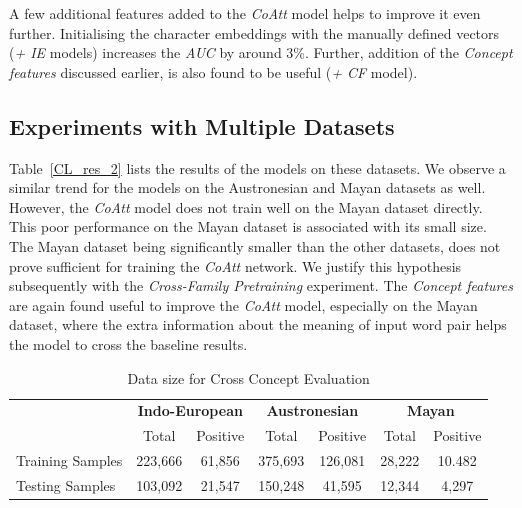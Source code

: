 \documentclass[11pt,letterpaper]{article}
\begin{document}
A few additional features added to the \textit{CoAtt} model helps to improve it even further. Initialising the character embeddings with the manually defined vectors (\textit{+ IE} models) increases the \textit{AUC} by around 3\%. Further, addition of the \textit{Concept features} discussed earlier, is also found to be useful (\textit{+ CF} model).

\subsection{Experiments with Multiple Datasets}

Table~\ref{CL_res_2} lists the results of the models on these datasets. We observe a similar trend for the models on the Austronesian and Mayan datasets as well. However, the \textit{CoAtt} model does not train well on the Mayan dataset directly. This poor performance on the Mayan dataset is associated with its small size. The Mayan dataset being significantly smaller than the other datasets, does not prove sufficient for training the \textit{CoAtt} network. We justify this hypothesis subsequently with the \textit{Cross-Family Pretraining} experiment. The \textit{Concept features} are again found useful to improve the \textit{CoAtt} model, especially on the Mayan dataset, where the extra information about the meaning of input word pair helps the model to cross the baseline results. 

\begin{table}[t]
\centering
\begin{tabular}{lcccccc}
\multicolumn{1}{c}{\textbf{}} & \multicolumn{2}{c}{\textbf{Indo-European}} & \multicolumn{2}{c}{\textbf{Austronesian}} & \multicolumn{2}{c}{\textbf{Mayan}} \\
\multicolumn{1}{c}{}          & Total               & Positive             & Total               & Positive            & Total           & Positive         \\
Training Samples              & 223,666             & 61,856               & 375,693             & 126,081             & 28,222          & 10.482           \\
Testing Samples               & 103,092             & 21,547               & 150,248             & 41,595              & 12,344          & 4,297           
\end{tabular}
\caption{Data size for Cross Concept Evaluation}
\label{CC_count}
\end{table}
\end{document}
